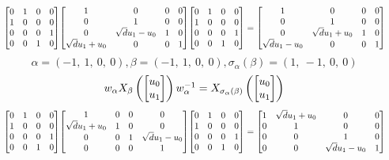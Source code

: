 \documentclass[11pt]{article}
\theoremstyle{definition}
\begin{document}
\[
\scaletoalign{\textwidth}{{\left[\begin{matrix}0 & 1 & 0 & 0\\1 & 0 & 0 & 0\\0 & 0 & 0 & 1\\0 & 0 & 1 & 0\end{matrix}\right]} {\left[\begin{matrix}1 & 0 & 0 & 0\\0 & 1 & 0 & 0\\0 & \sqrt{d} u_{1} - u_{0} & 1 & 0\\\sqrt{d} u_{1} + u_{0} & 0 & 0 & 1\end{matrix}\right]} {\left[\begin{matrix}0 & 1 & 0 & 0\\1 & 0 & 0 & 0\\0 & 0 & 0 & 1\\0 & 0 & 1 & 0\end{matrix}\right]} = {\left[\begin{matrix}1 & 0 & 0 & 0\\0 & 1 & 0 & 0\\0 & \sqrt{d} u_{1} + u_{0} & 1 & 0\\\sqrt{d} u_{1} - u_{0} & 0 & 0 & 1\end{matrix}\right]}}
\]
\[
\alpha = \left( -1, \  1, \  0, \  0\right), \beta = \left( -1, \  1, \  0, \  0\right), \sigma_{\alpha}(\beta) = \left( 1, \  -1, \  0, \  0\right)
\]
\[
\scaletoalign{\textwidth}{w_{\alpha} X_{\beta}\left(\left[\begin{matrix}u_{0}\\u_{1}\end{matrix}\right]\right) w_{\alpha}^{-1} = X_{\sigma_{\alpha}\left(\beta\right)}\left(\left[\begin{matrix}u_{0}\\u_{1}\end{matrix}\right]\right)}
\]
\[
\scaletoalign{\textwidth}{{\left[\begin{matrix}0 & 1 & 0 & 0\\1 & 0 & 0 & 0\\0 & 0 & 0 & 1\\0 & 0 & 1 & 0\end{matrix}\right]} {\left[\begin{matrix}1 & 0 & 0 & 0\\\sqrt{d} u_{1} + u_{0} & 1 & 0 & 0\\0 & 0 & 1 & \sqrt{d} u_{1} - u_{0}\\0 & 0 & 0 & 1\end{matrix}\right]} {\left[\begin{matrix}0 & 1 & 0 & 0\\1 & 0 & 0 & 0\\0 & 0 & 0 & 1\\0 & 0 & 1 & 0\end{matrix}\right]} = {\left[\begin{matrix}1 & \sqrt{d} u_{1} + u_{0} & 0 & 0\\0 & 1 & 0 & 0\\0 & 0 & 1 & 0\\0 & 0 & \sqrt{d} u_{1} - u_{0} & 1\end{matrix}\right]}}
\]
\end{document}
